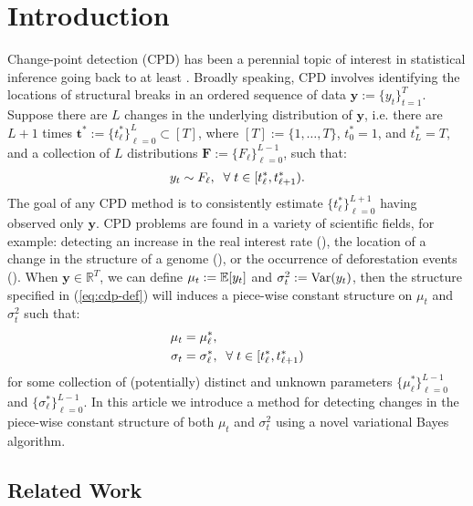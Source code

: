 \section{Introduction}
\label{sec:intro}

Change-point detection (CPD) has been a perennial topic of interest in statistical inference going back to at least \cite{Page54}. Broadly speaking, CPD involves identifying the locations of structural breaks in an ordered sequence of data $\mathbf{y} := \{y_t\}_{t=1}^T$. Suppose there are $L$ changes in the underlying distribution of $\mathbf{y}$, i.e. there are $L+1$ times $\mathbf{t}^*:=\{t^*_\ell\}_{\ell=0}^L \subset [T]$, where $[T] := \{1,\ldots,T\}$, $t^*_0=1$, and $t^*_L = T$, and a collection of $L$ distributions $\mathbf{F} := \{F_\ell\}_{\ell=0}^{L-1}$, such that:
\begin{align}\label{eq:cdp-def}
    y_t \sim F_\ell, \;\;\forall\; t \in [t^*_\ell,t^*_{\ell+1}).
\end{align}
The goal of any CPD method is to consistently estimate $\{t^*_\ell\}_{\ell=0}^{L+1}$ having observed only $\mathbf{y}$.  CPD problems are found in a variety of scientific fields, for example: detecting an increase in the real interest rate (\citealp{Bai03}), the location of a change in the structure of a genome (\citealp{Muggeo11}), or the occurrence of deforestation events (\citealp{Wendelberger21}). When $\mathbf{y} \in \mathbb{R}^T$, we can define $\mu_t := \mathbb{E}[y_t]$ and $\sigma^2_t := \text{Var}(y_t)$, then the structure specified in (\ref{eq:cdp-def}) will induces a piece-wise constant structure on $\mu_t$ and $\sigma^2_t$ such that:
\begin{align}
    \mu_t &= \mu^*_\ell, \\
    \sigma_t &= \sigma^*_\ell, \;\;\forall\; t \in [t^*_\ell,t^*_{\ell+1})
\end{align}
for some collection of (potentially) distinct and unknown parameters $\{\mu^*_\ell\}_{\ell=0}^{L-1}$ and $\{\sigma^*_\ell\}_{\ell=0}^{L-1}$. In this article we introduce a method for detecting changes in the piece-wise constant structure of both $\mu_t$ and $\sigma^2_t$ using a novel variational Bayes algorithm.

\subsection{Related Work}

